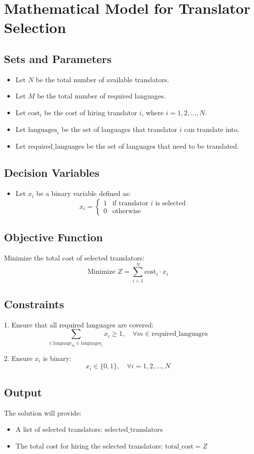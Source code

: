 \documentclass{article}
\begin{document}
\section*{Mathematical Model for Translator Selection}

\subsection*{Sets and Parameters}
\begin{itemize}
    \item Let \( N \) be the total number of available translators.
    \item Let \( M \) be the total number of required languages.
    \item Let \( \text{cost}_i \) be the cost of hiring translator \( i \), where \( i = 1, 2, \ldots, N \).
    \item Let \( \text{languages}_i \) be the set of languages that translator \( i \) can translate into.
    \item Let \( \text{required\_languages} \) be the set of languages that need to be translated.
\end{itemize}

\subsection*{Decision Variables}
\begin{itemize}
    \item Let \( x_i \) be a binary variable defined as:
    \[
    x_i = 
    \begin{cases} 
    1 & \text{if translator } i \text{ is selected} \\
    0 & \text{otherwise}
    \end{cases}
    \]
\end{itemize}

\subsection*{Objective Function}
Minimize the total cost of selected translators:
\[
\text{Minimize } Z = \sum_{i=1}^N \text{cost}_i \cdot x_i
\]

\subsection*{Constraints}
1. Ensure that all required languages are covered:
\[
\sum_{i: \text{language}_m \in \text{languages}_i} x_i \geq 1, \quad \forall m \in \text{required\_languages}
\]

2. Ensure \( x_i \) is binary:
\[
x_i \in \{0, 1\}, \quad \forall i = 1, 2, \ldots, N
\]

\subsection*{Output}
The solution will provide:
\begin{itemize}
    \item A list of selected translators: \( \text{selected\_translators} \)
    \item The total cost for hiring the selected translators: \( \text{total\_cost} = Z \)
\end{itemize}
\end{document}
